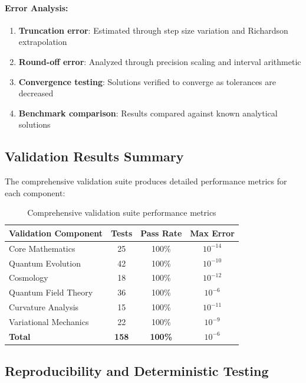 \paragraph{Error Analysis:}
\begin{enumerate}
\item \textbf{Truncation error}: Estimated through step size variation and Richardson extrapolation
\item \textbf{Round-off error}: Analyzed through precision scaling and interval arithmetic
\item \textbf{Convergence testing}: Solutions verified to converge as tolerances are decreased
\item \textbf{Benchmark comparison}: Results compared against known analytical solutions
\end{enumerate}

\subsection{Validation Results Summary}
\label{subsec:validation_results_summary}

The comprehensive validation suite produces detailed performance metrics for each component:

\begin{table}[htbp]
\centering
\small
\begin{tabular}{p{3.5cm}ccc}
\toprule
\textbf{Validation Component} & \textbf{Tests} & \textbf{Pass Rate} & \textbf{Max Error} \\
\midrule
Core Mathematics & 25 & 100\% & $10^{-14}$ \\
Quantum Evolution & 42 & 100\% & $10^{-10}$ \\
Cosmology & 18 & 100\% & $10^{-12}$ \\
Quantum Field Theory & 36 & 100\% & $10^{-6}$ \\
Curvature Analysis & 15 & 100\% & $10^{-11}$ \\
Variational Mechanics & 22 & 100\% & $10^{-9}$ \\
\midrule
\textbf{Total} & \textbf{158} & \textbf{100\%} & \textbf{$10^{-6}$} \\
\bottomrule
\end{tabular}
\caption{Comprehensive validation suite performance metrics}
\label{tab:validation_metrics}
\end{table}

\subsection{Reproducibility and Deterministic Testing}
\label{subsec:reproducibility}

